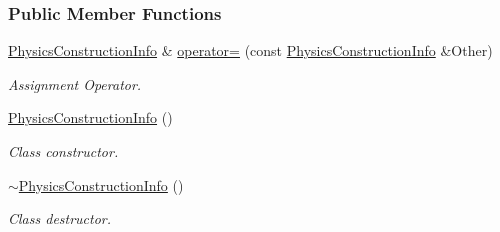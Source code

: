 \subsubsection*{Public Member Functions}
\begin{DoxyCompactItemize}
\item 
\hyperlink{classMezzanine_1_1PhysicsConstructionInfo}{PhysicsConstructionInfo} \& \hyperlink{classMezzanine_1_1PhysicsConstructionInfo_a5bbb296d18fed394076ae066e6862f93}{operator=} (const \hyperlink{classMezzanine_1_1PhysicsConstructionInfo}{PhysicsConstructionInfo} \&Other)
\begin{DoxyCompactList}\small\item\em Assignment Operator. \item\end{DoxyCompactList}\item 
\hypertarget{classMezzanine_1_1PhysicsConstructionInfo_a5e4c8044d232f5507dfd34cb434e9145}{
\hyperlink{classMezzanine_1_1PhysicsConstructionInfo_a5e4c8044d232f5507dfd34cb434e9145}{PhysicsConstructionInfo} ()}
\label{classMezzanine_1_1PhysicsConstructionInfo_a5e4c8044d232f5507dfd34cb434e9145}

\begin{DoxyCompactList}\small\item\em Class constructor. \item\end{DoxyCompactList}\item 
\hypertarget{classMezzanine_1_1PhysicsConstructionInfo_a65a6e6cd89e4089c98919b932a12bfbe}{
\hyperlink{classMezzanine_1_1PhysicsConstructionInfo_a65a6e6cd89e4089c98919b932a12bfbe}{$\sim$PhysicsConstructionInfo} ()}
\label{classMezzanine_1_1PhysicsConstructionInfo_a65a6e6cd89e4089c98919b932a12bfbe}

\begin{DoxyCompactList}\small\item\em Class destructor. \item\end{DoxyCompactList}\end{DoxyCompactItemize}
